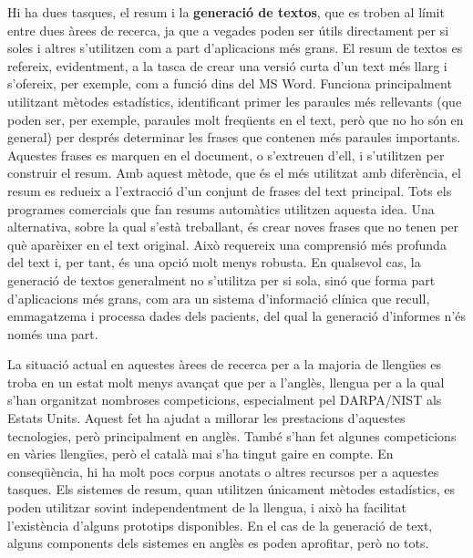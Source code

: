 \begin{multicols}{2}

Hi ha dues tasques, el resum i la \textbf{generació de textos}, que es troben al límit entre dues àrees de recerca, ja que a vegades poden ser útils directament per si soles i altres s’utilitzen com a part d’aplicacions més grans. El resum de textos es refereix, evidentment, a la tasca de crear una versió curta d’un text més llarg i s’ofereix, per exemple, com a funció dins del MS Word. Funciona principalment utilitzant mètodes estadístics, identificant primer les paraules més rellevants (que poden ser, per exemple, paraules molt freqüents en el text, però que no ho són en general) per després determinar les frases que contenen més paraules importants. Aquestes frases es marquen en el document, o s’extreuen d’ell, i s’utilitzen per construir el resum. Amb aquest mètode, que és el més utilitzat amb diferència, el resum es redueix a l’extracció d’un conjunt de frases del text principal. Tots els programes comercials que fan resums automàtics utilitzen aquesta idea. Una alternativa, sobre la qual s’està treballant, és crear noves frases que no tenen per què aparèixer en el text original. Això requereix una comprensió més profunda del text i, per tant, és una opció molt menys robusta. En qualsevol cas, la generació de textos generalment no s’utilitza per si sola, sinó que forma part d’aplicacions més grans, com ara un sistema d’informació clínica que recull, emmagatzema i processa dades dels pacients, del qual la generació d’informes n’és només una part. 


La situació actual en aquestes àrees de recerca per a la majoria de llengües es troba en un estat molt menys avançat que per a l’anglès, llengua per a la qual s’han organitzat nombroses competicions, especialment pel DARPA/NIST als Estats Units. Aquest fet ha ajudat a millorar les prestacions d’aquestes tecnologies, però principalment en anglès. També s’han fet algunes competicions en vàries llengües, però el català mai s’ha tingut gaire en compte. En conseqüència, hi ha molt pocs corpus anotats o altres recursos per a aquestes tasques. Els sistemes de resum, quan utilitzen únicament mètodes estadístics, es poden utilitzar sovint independentment de la llengua, i això ha facilitat l’existència d’alguns prototips disponibles. En el cas de la generació de text, alguns components dels sistemes en anglès es poden aprofitar, però no tots. 


\end{multicols}
